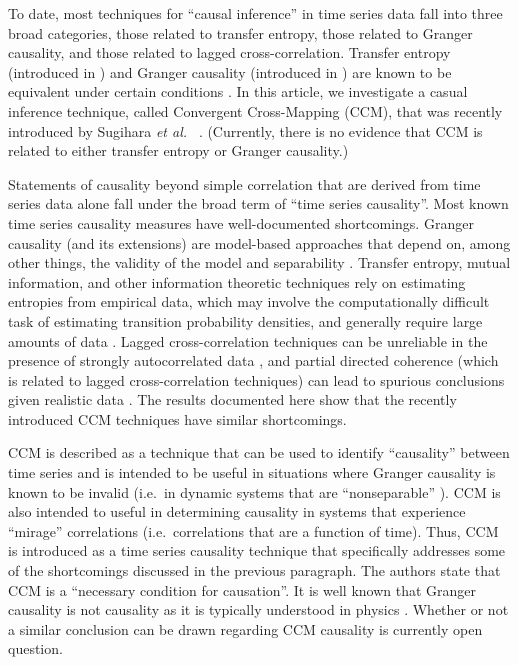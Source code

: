 \documentclass[twocolumn,aps,pre,groupedaddress]{revtex4-1}
\begin{document}
To date, most techniques for ``causal inference'' in time series data fall into three broad categories, those related to transfer entropy, those related to Granger causality, and those related to lagged cross-correlation.  Transfer entropy (introduced in \cite{Schreiber2000}) and Granger causality (introduced in \cite{granger1969}) are known to be equivalent under certain conditions \cite{Barnett2009}.  In this article, we investigate a casual inference technique, called Convergent Cross-Mapping (CCM), that was recently introduced by Sugihara {\em et al.\ } \cite{Sugihara2012}.  (Currently, there is no evidence that CCM is related to either transfer entropy or Granger causality.)

Statements of causality beyond simple correlation that are derived from time series data alone fall under the broad term of ``time series causality''.  Most known time series causality measures have well-documented shortcomings.  Granger causality (and its extensions) are model-based approaches that depend on, among other things, the validity of the model \cite{Kaminski2001,Granger1980} and separability \cite{Sugihara2012}.  Transfer entropy, mutual information, and other information theoretic techniques rely on estimating entropies from empirical data, which may involve the computationally difficult task of estimating transition probability densities, and generally require large amounts of data \cite{Kaiser2002,Schindler2007}.  Lagged cross-correlation techniques can be unreliable in the presence of strongly autocorrelated data \cite{box2013}, and partial directed coherence (which is related to lagged cross-correlation techniques) can lead to spurious conclusions given realistic data \cite{pascual2014}.  The results documented here show that the recently introduced CCM techniques have similar shortcomings.  

CCM is described as a technique that can be used to identify ``causality'' between time series and is intended to be useful in situations where Granger causality is known to be invalid (i.e.\ in dynamic systems that are ``nonseparable'' \cite{Sugihara2012}).  CCM is also intended to useful in determining causality in systems that experience ``mirage'' correlations \cite{Sugihara2012} (i.e.\ correlations that are a function of time).  Thus, CCM is introduced as a time series causality technique that specifically addresses some of the shortcomings discussed in the previous paragraph.  The authors state that CCM is a ``necessary condition for causation''.  It is well known that Granger causality is not causality as it is typically understood in physics \cite{Granger1980,liu2012,Roberts1985}.  Whether or not a similar conclusion can be drawn regarding CCM causality is currently open question. 
\end{document}
